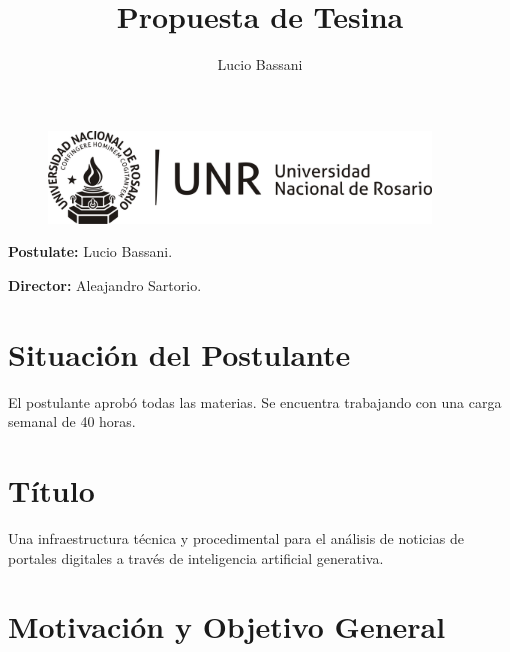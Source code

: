\documentclass[12pt]{article}
\title{Propuesta de Tesina}
\begin{document}
\author{Lucio Bassani}

\maketitle

\begin{figure}[h]
\centering
\includegraphics[width=4in]{LOGO-UNR-NEGRO.png}
\end{figure}

\textbf{Postulate:} Lucio Bassani.

\textbf{Director:} Aleajandro Sartorio.



\section{Situación del Postulante}
El postulante aprobó todas las materias. Se encuentra trabajando con una carga semanal de 40 horas.

\section{Título}
Una infraestructura técnica y procedimental para el análisis de noticias de portales digitales a través de inteligencia artificial generativa.



\section{Motivación y Objetivo General}\label{sec:Moti_O_G}

\end{document}
